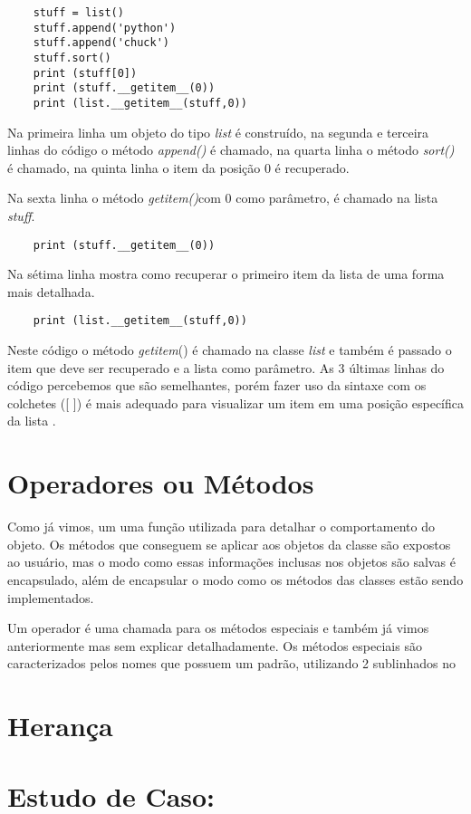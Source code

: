    \begin{lstlisting}
    stuff = list()
    stuff.append('python')
    stuff.append('chuck')
    stuff.sort()
    print (stuff[0])
    print (stuff.__getitem__(0))
    print (list.__getitem__(stuff,0))
    \end{lstlisting}
	
	Na primeira linha um objeto do tipo \textit{list} é construído, na segunda e terceira linhas do código o método \textit{append()} é chamado, na quarta linha o método \textit{sort()} é chamado, na quinta linha o item da posição 0 é recuperado. 
	
	Na sexta linha o método \textunderscore\textunderscore \textit{getitem()}\textunderscore\textunderscore  com 0 como parâmetro, é chamado na lista \textit{stuff}.
	\begin{lstlisting}
    print (stuff.__getitem__(0))
	\end{lstlisting}

	Na sétima linha mostra como recuperar o primeiro item da lista de uma forma mais detalhada.
	\begin{lstlisting}
    print (list.__getitem__(stuff,0))
	\end{lstlisting}
	
	Neste código o método \textunderscore\textunderscore \textit{getitem}\textunderscore\textunderscore () é chamado na classe \textit{list} e também é passado o item que deve ser recuperado e a lista como parâmetro. As 3 últimas linhas do código percebemos que são semelhantes, porém fazer uso da sintaxe com os colchetes ([ ]) é mais adequado para visualizar um item em uma posição específica da lista \cite{Severance2016}.
	
    \section{Operadores ou Métodos}
	Como já vimos, um uma função utilizada para detalhar o comportamento do objeto. Os métodos que conseguem se aplicar aos objetos da classe são expostos ao usuário, mas o modo como essas informações inclusas nos objetos são salvas é encapsulado, além de encapsular o modo como os métodos das classes estão sendo implementados.
	 
	Um operador é uma chamada para os métodos especiais e também já vimos anteriormente mas sem explicar detalhadamente. Os métodos especiais são caracterizados pelos nomes que possuem um padrão, utilizando 2 sublinhados no 
	
    \section{Herança}


    \section{Estudo de Caso: }
